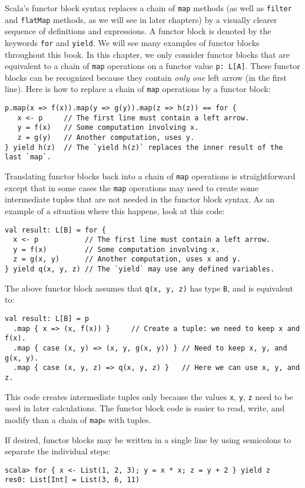 Scala\textsf{'}s functor block syntax replaces a chain of \lstinline!map!
methods (as well as \lstinline!filter! and \lstinline!flatMap! methods,
as we will see in later chapters) by a visually clearer sequence of
definitions and expressions. A functor block is denoted by the keywords
\lstinline!for! and \lstinline!yield!. We will see many examples
of functor blocks throughout this book. In this chapter, we only consider
functor blocks that are equivalent to a chain of \lstinline!map!
operations on a functor value \lstinline!p: L[A]!. These functor
blocks can be recognized because they contain \emph{only one} left
arrow (in the first line). Here is how to replace a chain of \lstinline!map!
operations by a functor block:
\begin{lstlisting}
p.map(x => f(x)).map(y => g(y)).map(z => h(z)) == for {
   x <- p     // The first line must contain a left arrow.
   y = f(x)   // Some computation involving x.
   z = g(y)   // Another computation, uses y.
} yield h(z)  // The `yield h(z)` replaces the inner result of the last `map`.
\end{lstlisting}
Translating functor blocks back into a chain of \lstinline!map! operations
is straightforward except that in some cases the \lstinline!map!
operations may need to create some intermediate tuples that are not
needed in the functor block syntax. As an example of a situation where
this happens, look at this code:
\begin{lstlisting}
val result: L[B] = for {
  x <- p           // The first line must contain a left arrow.
  y = f(x)         // Some computation involving x.
  z = g(x, y)      // Another computation, uses x and y.
} yield q(x, y, z) // The `yield` may use any defined variables.
\end{lstlisting}
The above functor block assumes that \lstinline!q(x, y, z)! has type
\lstinline!B!, and is equivalent to:
\begin{lstlisting}
val result: L[B] = p
  .map { x => (x, f(x)) }     // Create a tuple: we need to keep x and f(x).
  .map { case (x, y) => (x, y, g(x, y)) } // Need to keep x, y, and g(x, y).
  .map { case (x, y, z) => q(x, y, z) }   // Here we can use x, y, and z.
\end{lstlisting}
This code creates intermediate tuples only because the values \lstinline!x!,
\lstinline!y!, \lstinline!z! need to be used in later calculations.
The functor block code is easier to read, write, and modify than a
chain of \lstinline!map!s with tuples. 

If desired, functor blocks may be written in a single line by using
semicolons to separate the individual steps:
\begin{lstlisting}
scala> for { x <- List(1, 2, 3); y = x * x; z = y + 2 } yield z
res0: List[Int] = List(3, 6, 11)
\end{lstlisting}

